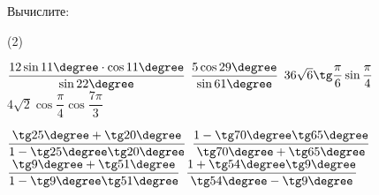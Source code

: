 \begin{consultation}
\begin{listofex}
		\item Вычислите:
		\begin{tasks}(2)
			
			\task \( \dfrac{12 \sin 11 \degree \cdot \cos 11 \degree}{\sin 22 \degree} \)
			\task \( \dfrac{5 \cos 29 \degree}{\sin 61 \degree} \)
			\task \( 36 \sqrt{6} \tg \dfrac{\pi}{6} \sin \dfrac{\pi}{4} \)
			\task \( 4 \sqrt{2} \cos \dfrac{\pi}{4} \cos \dfrac{7\pi}{3} \)
			
			\task \( \dfrac{\tg 25 \degree + \tg 20 \degree}{1-\tg 25 \degree \tg 20 \degree} \)
			\task \( \dfrac{1-\tg 70 \degree \tg 65 \degree}{\tg 70 \degree + \tg 65 \degree} \)
			\task \( \dfrac{\tg 9 \degree + \tg 51 \degree}{1-\tg 9 \degree \tg 51 \degree} \)
			\task \( \dfrac{1+\tg 54 \degree \tg 9 \degree}{\tg 54 \degree - \tg 9 \degree} \)
		\end{tasks}
	\end{listofex}
\end{consultation}

